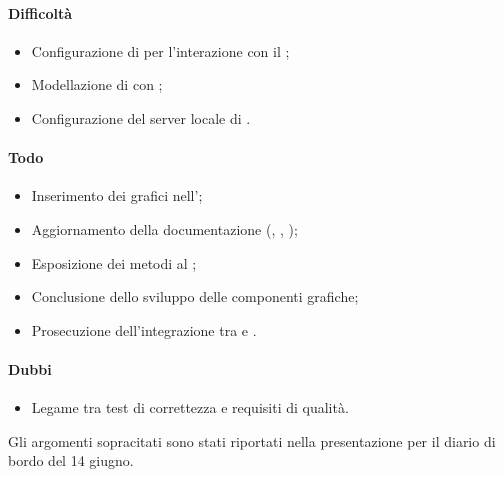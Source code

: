 \paragraph{Difficoltà}
\begin{itemize}
	\item Configurazione di  per l'interazione con il ;
	\item Modellazione di  con ;
	\item Configurazione del server locale di .
\end{itemize}	

\paragraph{Todo}
\begin{itemize}
	\item Inserimento dei grafici nell'\AdR;
	\item Aggiornamento della documentazione (\PdP, \PdQ, \AdR);
	\item Esposizione dei metodi al ;
	\item Conclusione dello sviluppo delle componenti grafiche;
	\item Prosecuzione dell'integrazione tra  e .		
\end{itemize}

\paragraph{Dubbi}
\begin{itemize}
	\item Legame tra test di correttezza e requisiti di qualità.
\end{itemize}

\vspace{0.5\baselineskip}
\par Gli argomenti sopracitati sono stati riportati nella presentazione per il diario di bordo del 14 giugno.
